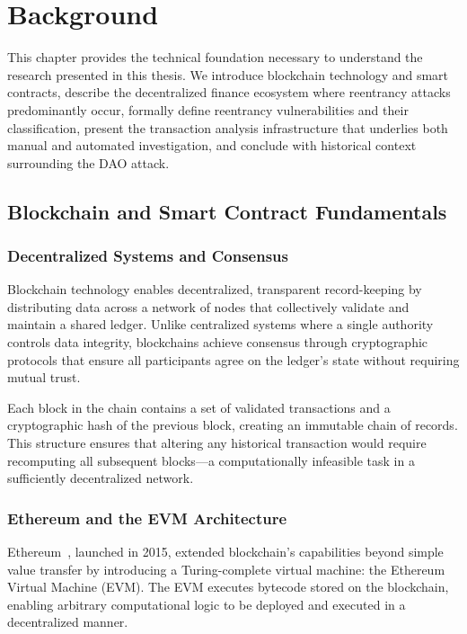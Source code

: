 \chapter{Background}
\label{ch:background}

This chapter provides the technical foundation necessary to understand the research presented in this thesis. We introduce blockchain technology and smart contracts, describe the decentralized finance ecosystem where reentrancy attacks predominantly occur, formally define reentrancy vulnerabilities and their classification, present the transaction analysis infrastructure that underlies both manual and automated investigation, and conclude with historical context surrounding the DAO attack.

\section{Blockchain and Smart Contract Fundamentals}
\label{sec:bg-blockchain}

\subsection{Decentralized Systems and Consensus}

Blockchain technology enables decentralized, transparent record-keeping by distributing data across a network of nodes that collectively validate and maintain a shared ledger. Unlike centralized systems where a single authority controls data integrity, blockchains achieve consensus through cryptographic protocols that ensure all participants agree on the ledger's state without requiring mutual trust.

Each block in the chain contains a set of validated transactions and a cryptographic hash of the previous block, creating an immutable chain of records. This structure ensures that altering any historical transaction would require recomputing all subsequent blocks---a computationally infeasible task in a sufficiently decentralized network.

\subsection{Ethereum and the EVM Architecture}

Ethereum~\cite{ethereum-whitepaper}, launched in 2015, extended blockchain's capabilities beyond simple value transfer by introducing a Turing-complete virtual machine: the Ethereum Virtual Machine (EVM). The EVM executes bytecode stored on the blockchain, enabling arbitrary computational logic to be deployed and executed in a decentralized manner.

